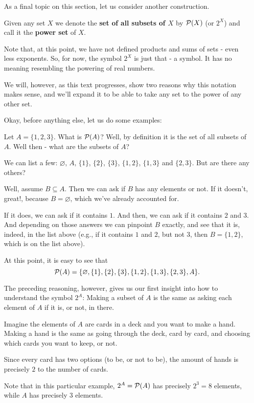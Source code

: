 \bigskip
As a final topic on this section, let us consider another construction.

\begin{df}
	Given any set $X$ we denote the \textbf{set of all subsets of $X$} by $\mathcal P(X)$ (or $2^X$) and call it the \textbf{power set} of $X$.
\end{df}
\begin{rmk}
	Note that, at this point, we have not defined products and sums of sets - even less exponents. So, for now, the symbol $2^X$ is just that - a symbol. It has no meaning resembling the powering of real numbers.
	
	We will, however, as this text progresses, show two reasons why this notation makes sense, and we'll expand it to be able to take any set to the power of any other set.
\end{rmk}

Okay, before anything else, let us do some examples:
\begin{ex}
	Let $A=\{1,2,3\}$. What is $\mathcal P(A)$? Well, by definition it is the set of all subsets of $A$. Well then - what are the subsets of $A$?
	
	We can list a few: $\varnothing$, $A$, $\{1\}$, $\{2\}$, $\{3\}$, $\{1,2\}$, $\{1,3\}$ and $\{2,3\}$. But are there any others?
	
	Well, assume $B\subseteq A$. Then we can ask if $B$ has any elements or not. If it doesn't, great!, because $B=\varnothing$, which we've already accounted for.
	
	If it does, we can ask if it contains $1$. And then, we can ask if it contains $2$ and $3$. And depending on those answers we can pinpoint $B$ exactly, and see that it is, indeed, in the list above (e.g., if it contains $1$ and $2$, but not $3$, then $B=\{1,2\}$, which is on the list above).
	
	At this point, it is easy to see that\[\mathcal P(A)=\{\varnothing,\{1\},\{2\},\{3\},\{1,2\},\{1,3\},\{2,3\},A\}.\]
	
	The preceding reasoning, however, gives us our first insight into how to understand the symbol $2^A$: Making a subset of $A$ is the same as asking each element of $A$ if it is, or not, in there.
	
	Imagine the elements of $A$ are cards in a deck and you want to make a hand. Making a hand is the same as going through the deck, card by card, and choosing which cards you want to keep, or not.
	
	Since every card has two options (to be, or not to be), the amount of hands is precisely $2$ to the number of cards.
	
	Note that in this particular example, $2^A=\mathcal P(A)$ has precisely $2^3=8$ elements, while $A$ has precisely $3$ elements.
\end{ex}

